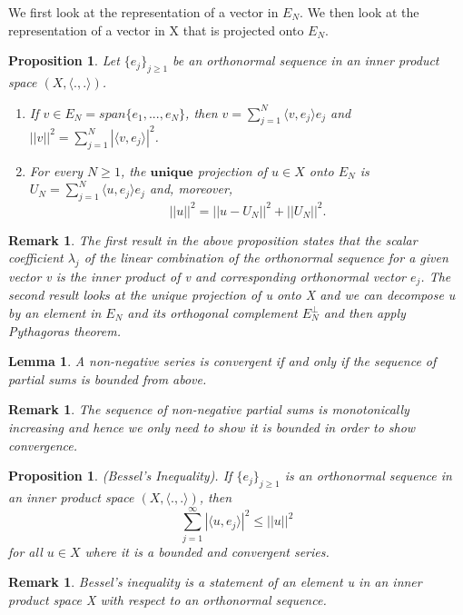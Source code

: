 \documentclass[twoside]{article}
\newtheorem{lemma}[theorem]{Lemma}
\newtheorem{proposition}[theorem]{Proposition}
\newtheorem{remark}[theorem]{Remark}
\begin{document}
We first look at the representation of a vector in $E_N$. We then look at the representation of a vector in X that is projected onto $E_N$.
\begin{proposition}Let $\{e_j\}_{j \geq 1}$ be an orthonormal sequence in an inner product space $(X, \langle.,.\rangle)$.
\begin{enumerate}
 \item If $v \in E_N = span\{e_1,...,e_N\}$, then $v = \sum_{j=1}^N\langle v, e_j \rangle e_j$ and $||v||^2 = \sum_{j=1}^N|\langle v, e_j \rangle|^2$.

 \item For every $N \geq 1$, the $\textbf{unique}$ projection of $u \in X$ onto $E_N$ is $U_N = \sum_{j=1}^N\langle u, e_j\rangle e_j$ and, moreover, $$||u||^2 = ||u - U_N||^2 + ||U_N||^2.$$
 \end{enumerate}
\end{proposition}

\begin{remark}The first result in the above proposition states that the scalar coefficient $\lambda_j$ of the linear combination of the orthonormal sequence for a given vector v is the inner product of v and corresponding orthonormal vector $e_j$. The second result looks at the unique projection of u onto X and we can decompose u by an element in $E_N$ and its orthogonal complement $E_{N}^{\perp}$ and then apply Pythagoras theorem.
\end{remark}

\begin{lemma}A non-negative series is convergent if and only if the sequence of partial sums is bounded from above.
\end{lemma}
\begin{remark}The sequence of non-negative partial sums is monotonically increasing and hence we only need to show it is bounded in order to show convergence.
\end{remark}

\begin{proposition}(Bessel's Inequality). If $\{e_j\}_{j \geq 1}$ is an orthonormal sequence in an inner product space $(X, \langle .,. \rangle)$, then
$$
\sum_{j=1}^{\infty}|\langle u, e_j \rangle|^2 \leq ||u||^2
$$
for all $u \in X$ where it is a bounded and convergent series.
\end{proposition}

\begin{remark}
Bessel's inequality is a statement of an element u in an inner product space X with respect to an orthonormal sequence.
\end{remark}
\end{document}
